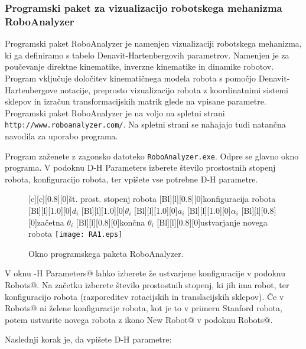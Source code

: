 \clearpage
\subsubsection{Programski paket za vizualizacijo robotskega mehanizma RoboAnalyzer}

Programski paket RoboAnalyzer je namenjen vizualizaciji robotskega mehanizma, ki ga definiramo s tabelo Denavit-Hartenbergovih parametrov. Namenjen je za poučevanje direktne kinematike, inverzne kinematike in dinamike robotov. Program vključuje določitev kinematičnega modela robota s pomočjo Denavit-Hartenbergove notacije, preprosto vizualizacijo robota z koordinatnimi sistemi sklepov in izračun transformacijskih matrik glede na vpisane parametre. Programski paket RoboAnalyzer je na voljo na spletni strani \texttt{http://www.roboanalyzer.com/}. Na spletni strani se nahajajo tudi natančna navodila za uporabo programa.


Program zaženete z zagonsko datoteko \texttt{RoboAnalyzer.exe}. Odpre se glavno okno programa. V podoknu D-H Parameters izberete število prostostnih stopenj robota, konfiguracijo robota, ter vpišete vse potrebne D-H parametre.



\begin{figure}[h]
	\centering 
	[c][0.8][0]{št. prost. stopenj robota}
	[Bl][l][0.8][0]{konfiguracija robota}
	[Bl][l][1.0][0]{$d_i$}	
	[Bl][l][1.0][0]{$\theta_i$}
	[Bl][l][1.0][0]{$a_i$}		
	[Bl][l][1.0][0]{$\alpha_i$}		
	[Bl][l][0.8][0]{za\v cetna $\theta_i$}		
	[Bl][l][0.8][0]{kon\v cna $\theta_i$}		
	[Bl][l][0.8][0]{ustvarjanje novega robota}
	\texttt{[image: RA1.eps]}
	\caption{\label{RA1} Okno programskega paketa RoboAnalyzer.}
\end{figure}



V oknu \verb@D-H Parameters@ lahko izberete \v ze ustvarjene konfiguracije v podoknu \verb@Default Robots@. Na začetku izberete število prostostnih stopenj, ki jih ima robot, ter konfiguracijo robota (razporeditev rotacijskih in translacijskih sklepov). \v Ce v \verb@Default Robots@ ni \v zelene konfiguracije robota, kot je to v primeru Stanford robota, potem ustvarite novega robota z ikono \verb@Add New Robot@ v podoknu \verb@Custom Robots@.

Naslednji korak je, da vpišete D-H parametre:

